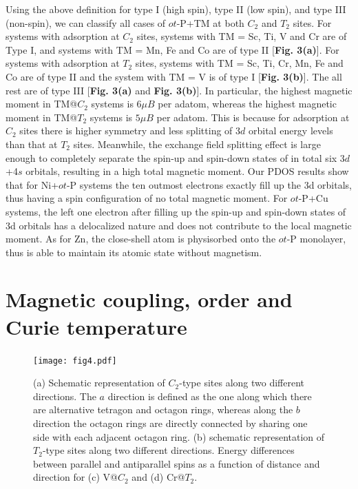 \documentclass[%
superscriptaddress,
preprint,
showpacs,preprintnumbers,
 amsmath,amssymb,
prb,
]{revtex4-1}
\begin{document}
Using the above definition for type I (high spin), type II (low
spin), and type III (non-spin), we can classify all cases of $ot$-P+TM at both $C_2$ and $T_2$ sites. For systems with adsorption
at $C_{2}$ sites, systems with TM = Sc, Ti, V and Cr are of Type
I, and systems with TM = Mn, Fe and Co are of type II [\textbf{Fig. 3(a)}]. For systems with
adsorption at $T_2$ sites, systems with TM = Sc, Ti, Cr, Mn, Fe and Co are of type II
and the system with TM = V is of type I [\textbf{Fig. 3(b)}]. The all rest are of type III [\textbf{Fig. 3(a)} and \textbf{Fig. 3(b)}]. In particular,
the highest magnetic moment in TM@$C_{2}$ systems is $6\ensuremath{\mu}B$
per adatom, whereas the highest magnetic moment in TM@$T_{2}$
systems is $5\ensuremath{\mu}B$ per adatom. This is because for adsorption
at $C_{2}$ sites there is higher symmetry and less splitting of 3$d$
orbital energy levels than that at $T_{2}$ sites. Meanwhile, the exchange field splitting effect is large enough to completely separate the spin-up and spin-down states of
in total six 3$d$+4$s$ orbitals, resulting in a high total magnetic moment. Our PDOS results show that for Ni+$ot$-P systems the ten outmost electrons exactly fill up the
3d orbitals, thus having a spin configuration of no total magnetic
moment. For $ot$-P+Cu systems, the left one electron after filling up
the spin-up and spin-down states of 3d orbitals has a delocalized
nature and does not contribute to the local magnetic moment. As for
Zn, the close-shell atom is physisorbed onto the $ot$-P monolayer, thus
is able to maintain its atomic state without magnetism.


\section{Magnetic coupling, order and Curie temperature}


\begin{figure}[ptb]
\centering
\texttt{[image: fig4.pdf]}
\caption{{\footnotesize{}(a) Schematic representation of $C_2$-type sites along two different directions. The $a$ direction is defined as the one along which there are alternative tetragon and octagon rings, whereas along the $b$ direction the octagon rings are directly connected by sharing one side with each adjacent octagon ring. (b) schematic representation of $T_2$-type sites along two different directions. Energy differences between parallel and antiparallel spins as a function of distance and direction for (c) V@$C_2$ and (d) Cr@$T_2$. \label{FM-AFM-Ediff}}}
\end{figure}
\end{document}
